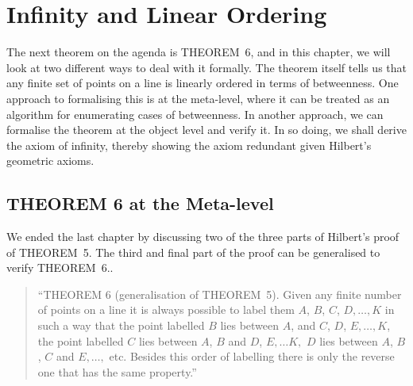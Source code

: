 \chapter{Infinity and Linear Ordering}\label{chapter:LinearOrder}
The next theorem on the agenda is THEOREM~6, and in this chapter, we will look at two different ways to deal with it formally. The theorem itself tells us that any finite set of points on a line is linearly ordered in terms of betweenness. One approach to formalising this is at the meta-level, where it can be treated as an algorithm for enumerating cases of betweenness. In another approach, we can formalise the theorem at the object level and verify it. In so doing, we shall derive the axiom of infinity, thereby showing the axiom redundant given Hilbert's geometric axioms.

\section{THEOREM 6 at the Meta-level}\label{sec:Theorem6}
We ended the last chapter by discussing two of the three parts of Hilbert's proof of THEOREM~5. The third and final part of the proof can be generalised to verify THEOREM~6..

\begin{quote}
  ``THEOREM 6 (generalisation of THEOREM~5). Given any finite number of points on a line it is always possible to label them $A$, $B$, $C$, $D, \ldots, K$ in such a way that the point labelled $B$ lies between $A$, and $C$, $D$, $E, \ldots, K$, the point labelled $C$ lies between $A$, $B$ and $D$, $E,\ldots K,$ $D$ lies between $A$, $B$, $C$ and $E, \ldots,$ etc. Besides this order of labelling there is only the reverse one that has the same property.''
\end{quote}

